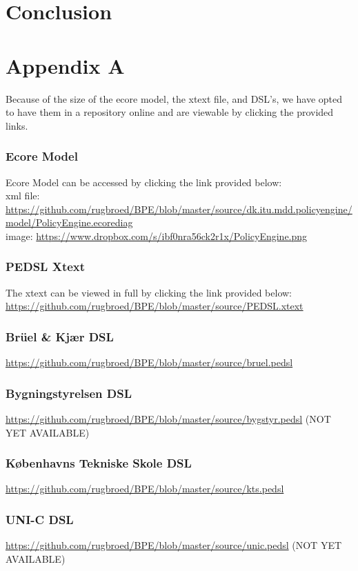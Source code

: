\documentclass{llncs}
\begin{document}
\section{Conclusion}\label{sec:conclusion}

{}


\section{Appendix A}\label{sec:appendix-a}
Because of the size of the ecore model, the xtext file, and DSL's, we have opted to have them in a repository online and are viewable by clicking the provided links.

\subsubsection{Ecore Model}\label{sec:ecore-model}
Ecore Model can be accessed by clicking the link provided below:
\\xml file:
\url{https://github.com/rugbroed/BPE/blob/master/source/dk.itu.mdd.policyengine/model/PolicyEngine.ecorediag}
\\image:
\url{https://www.dropbox.com/s/ibf0nra56ck2r1x/PolicyEngine.png}
\subsubsection{PEDSL Xtext}\label{sec:xtext-pedsl}
The xtext can be viewed in full by clicking the link provided below:\\
\url{https://github.com/rugbroed/BPE/blob/master/source/PEDSL.xtext}

\subsubsection{Br\"{u}el \& Kj\ae r DSL}\label{sec:dsl-bruel}
\url{https://github.com/rugbroed/BPE/blob/master/source/bruel.pedsl}

\subsubsection{Bygningstyrelsen DSL}\label{sec:dsl-bygstyr}
\url{https://github.com/rugbroed/BPE/blob/master/source/bygstyr.pedsl} (NOT YET AVAILABLE)

\subsubsection{K\o benhavns Tekniske Skole DSL}\label{sec:dsl-kts}
\url{https://github.com/rugbroed/BPE/blob/master/source/kts.pedsl}


\subsubsection{UNI-C DSL}\label{sec:dsl-uni-c}
\url{https://github.com/rugbroed/BPE/blob/master/source/unic.pedsl} (NOT YET AVAILABLE)
\end{document}
